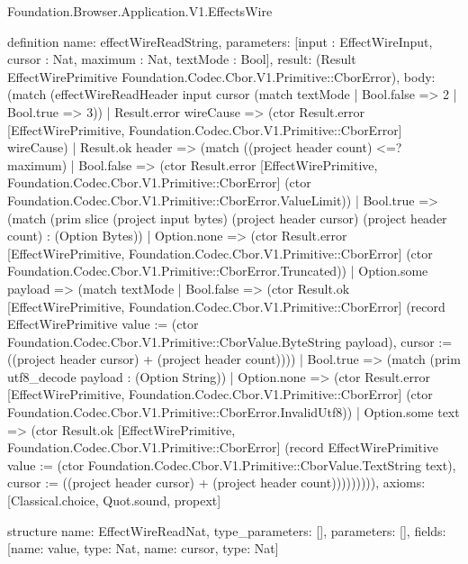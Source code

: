 \begin{lexlean}{Foundation.Browser.Application.V1.EffectsWire}
\begin{semanticmodule}
definition{
  name: effectWireReadString,
  parameters: [input : EffectWireInput, cursor : Nat, maximum : Nat, textMode : Bool],
  result: (Result EffectWirePrimitive Foundation.Codec.Cbor.V1.Primitive::CborError),
  body: (match (effectWireReadHeader input cursor (match textMode
      | Bool.false => 2
      | Bool.true => 3))
    | Result.error wireCause => (ctor Result.error [EffectWirePrimitive, Foundation.Codec.Cbor.V1.Primitive::CborError] wireCause)
    | Result.ok header => (match ((project header count) <=? maximum)
      | Bool.false => (ctor Result.error [EffectWirePrimitive, Foundation.Codec.Cbor.V1.Primitive::CborError] (ctor Foundation.Codec.Cbor.V1.Primitive::CborError.ValueLimit))
      | Bool.true => (match (prim slice (project input bytes) (project header cursor) (project header count) : (Option Bytes))
        | Option.none => (ctor Result.error [EffectWirePrimitive, Foundation.Codec.Cbor.V1.Primitive::CborError] (ctor Foundation.Codec.Cbor.V1.Primitive::CborError.Truncated))
        | Option.some payload => (match textMode
          | Bool.false => (ctor Result.ok [EffectWirePrimitive, Foundation.Codec.Cbor.V1.Primitive::CborError] (record EffectWirePrimitive {value := (ctor Foundation.Codec.Cbor.V1.Primitive::CborValue.ByteString payload), cursor := ((project header cursor) + (project header count))}))
          | Bool.true => (match (prim utf8_decode payload : (Option String))
            | Option.none => (ctor Result.error [EffectWirePrimitive, Foundation.Codec.Cbor.V1.Primitive::CborError] (ctor Foundation.Codec.Cbor.V1.Primitive::CborError.InvalidUtf8))
            | Option.some text => (ctor Result.ok [EffectWirePrimitive, Foundation.Codec.Cbor.V1.Primitive::CborError] (record EffectWirePrimitive {value := (ctor Foundation.Codec.Cbor.V1.Primitive::CborValue.TextString text), cursor := ((project header cursor) + (project header count))}))))))),
  axioms: [Classical.choice, Quot.sound, propext]
}

structure{
  name: EffectWireReadNat,
  type_parameters: [],
  parameters: [],
  fields: [{name: value, type: Nat}, {name: cursor, type: Nat}]
}


\end{semanticmodule}
\end{lexlean}
